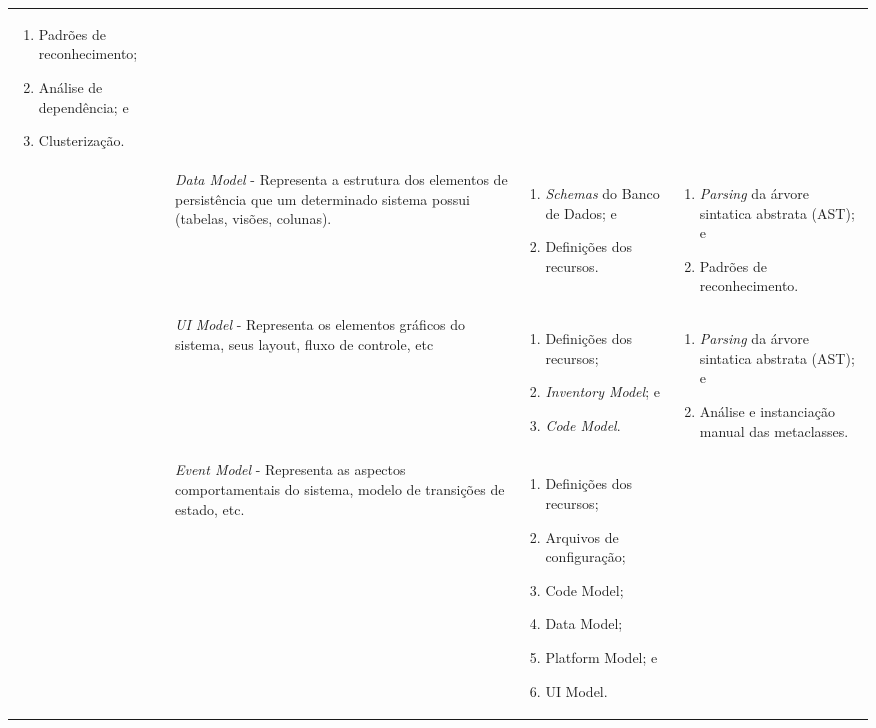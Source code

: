 \begin{longtable}{ | m{2.5cm} | m{5.9cm}| m{3.5cm} | m{3.5cm} | }
\begin{enumerate}
	\item Padrões de reconhecimento;
	\item Análise de dependência; e
	\item Clusterização.
\end{enumerate} \tabularnewline
\cline{2-4} 
 & \emph{Data Model} \newline - Representa a estrutura dos elementos de persistência que um determinado sistema possui (tabelas, visões, colunas). & \begin{enumerate}
	\item \emph{Schemas} do Banco de Dados; e
	\item Definições dos recursos.
\end{enumerate} & \begin{enumerate}
	\item \emph{Parsing} da árvore sintatica abstrata (AST); e
 	\item Padrões de reconhecimento.
\end{enumerate} \tabularnewline
\cline{2-4} 
 &  \emph{UI Model} \newline - Representa os elementos gráficos do sistema, seus layout, fluxo de controle, etc & \begin{enumerate}
 	\item Definições dos recursos;
 	\item \emph{Inventory Model}; e
 	\item \emph{Code Model}.
 \end{enumerate} & \begin{enumerate}
 	\item \emph{Parsing} da árvore sintatica abstrata (AST); e
 	\item Análise e instanciação manual das metaclasses.
 \end{enumerate} \tabularnewline
\cline{2-4} 
 & \emph{Event Model} \newline - Representa as aspectos comportamentais do sistema, modelo de transições de estado, etc. & \begin{enumerate}
 	\item Definições dos recursos;
 	\item Arquivos de configuração;
 	\item Code Model;
 	\item Data Model;
 	\item Platform Model; e
 	\item UI Model.
 \end{enumerate} & \begin{enumerate}

\end{enumerate}
\end{longtable}
